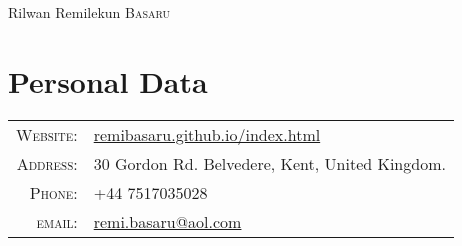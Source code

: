\documentclass[letterpaper,11pt]{article}
\begin{document}
\par{\centering
		{\Huge Rilwan Remilekun \textsc{Basaru}
	}\bigskip\par}

\section{Personal Data}

\hspace{1cm}
\begin{tabular}{rl}
    \textsc{ Website:} & \hspace{1cm} \href{remibasaru.github.io/index.html}{remibasaru.github.io/index.html} \\
    \textsc{Address:}   & \hspace{1cm} 30 Gordon Rd. Belvedere, Kent, United Kingdom. \\
    \textsc{Phone:}     & \hspace{1cm} +44 7517035028\\
    \textsc{email:}     & \hspace{1cm} \href{mailto:remi.basaru@aol.com}{remi.basaru@aol.com}
\end{tabular}


\renewcommand{\arraystretch}{1.5}
\end{document}
